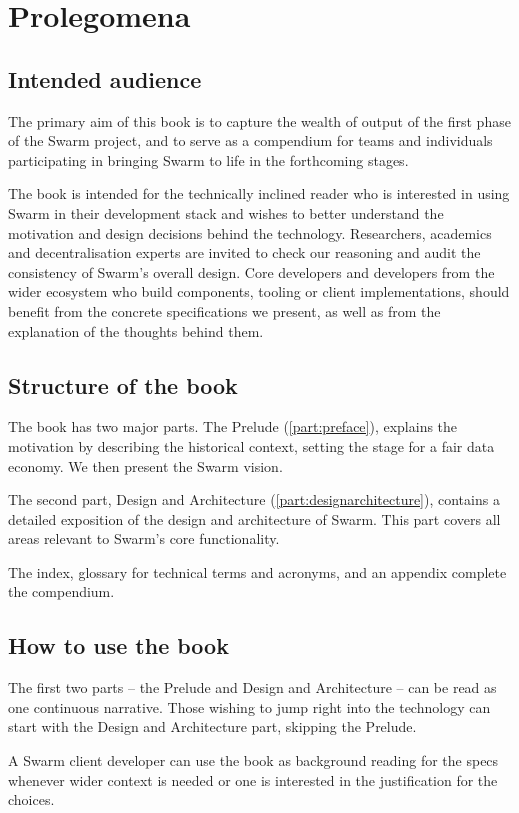 \chapter{Prolegomena \statusgreen}
\green{}
\section*{Intended audience \statusgreen}
The primary aim of this book is to capture the wealth of output of the first phase of the Swarm project, and to serve as a compendium for teams and individuals participating in bringing Swarm to life in the forthcoming stages.

The book is intended for the technically inclined reader who is interested in using Swarm in their development stack and wishes to better understand the motivation and design decisions behind the technology. Researchers, academics and decentralisation experts are invited to check our reasoning and audit the consistency of Swarm's overall design. Core developers and developers from the wider ecosystem who build components, tooling or client implementations, should benefit from the concrete specifications we present, as well as from the explanation of the thoughts behind them.

\section*{Structure of the book \statusgreen}

The book has two major parts. The Prelude (\ref{part:preface}), explains the motivation by describing the historical context, setting the stage for a fair data economy. We then present the Swarm vision.

The second part, Design and Architecture (\ref{part:designarchitecture}), contains a detailed exposition of the design and architecture of Swarm. This part covers all areas relevant to Swarm's core functionality.

The index, glossary for technical terms and acronyms, and an appendix complete the compendium.

\section*{How to use the book \statusgreen}

The first two parts – the Prelude and  Design and Architecture – can be read as one continuous narrative. Those wishing to jump right into the technology can start with the Design and Architecture part, skipping the Prelude.

A Swarm client developer can use the book as background reading for the specs whenever wider context is needed or one is interested in the justification for the choices.
